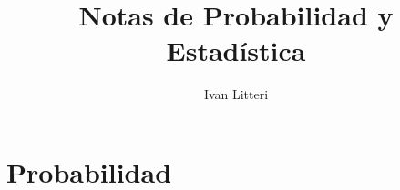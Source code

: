 \documentclass{article}
\title{Notas de Probabilidad y Estadística}
\author{Ivan Litteri}
\date{}
\begin{document}
\maketitle

% 

\section{Probabilidad}

\end{document}

